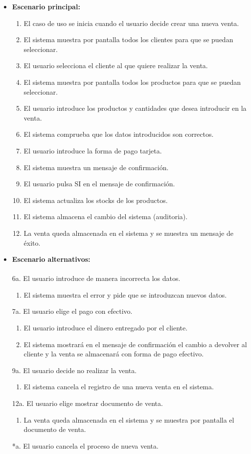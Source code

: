 \begin{itemize}\renewcommand{\labelitemi}{$\circ$}
 \item \textbf{Escenario principal:}
         \begin{enumerate}
          \item El caso de uso se inicia cuando el usuario decide crear una nueva venta.
 	 \item El sistema muestra por pantalla todos los clientes para que se puedan seleccionar.
	\item El usuario selecciona el cliente al que quiere realizar la venta.
          \item El sistema muestra por pantalla todos los productos para que se puedan seleccionar.
          \item El usuario introduce los productos y cantidades que desea introducir en la venta.
          \item El sistema comprueba que los datos introducidos son correctos.
	  \item El usuario introduce la forma de pago tarjeta.
  	  \item El sistema muestra un mensaje de confirmación.
          \item El usuario pulsa SI en el mensaje de confirmación.
	  \item El sistema actualiza los stocks de los productos.
 	  \item El sistema almacena el cambio del sistema (auditoria).
          \item La venta queda almacenada en el sistema y se muestra un mensaje de éxito.
         \end{enumerate}
  \item \textbf{Escenario alternativos:}\\\\
	  6a. El usuario introduce de manera incorrecta los datos.
		\begin{enumerate}
		 \item El sistema muestra el error y pide que se introduzcan nuevos datos.
		\end{enumerate}
	7a. El usuario elige el pago con efectivo.
		\begin{enumerate}
		\item El usuario introduce el dinero entregado por el cliente.
		
		 \item El sistema mostrará en el mensaje de confirmación el cambio a devolver al cliente y la venta se almacenará con forma de pago efectivo.
		\end{enumerate}
	 9a. El usuario decide no realizar la venta.
	      \begin{enumerate}
	       \item El sistema cancela el registro de una nueva venta en el sistema.
	      \end{enumerate}
         12a. El usuario elige mostrar documento de venta.
	      \begin{enumerate}
	       \item La venta queda almacenada en el sistema y se muestra por pantalla el documento de venta.
	      \end{enumerate}
          *a. El usuario cancela el proceso de nueva venta.
\end{itemize}
